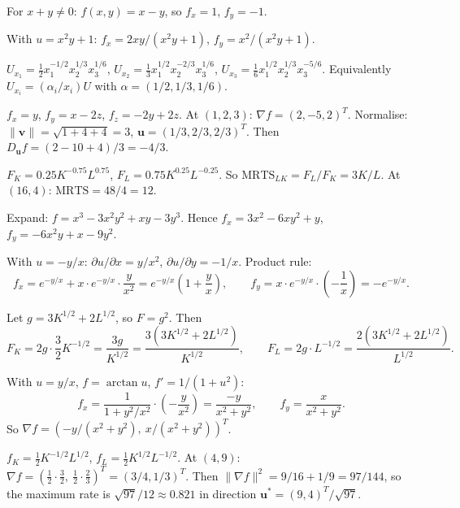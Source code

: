 \begin{solutions}
  \item For $x+y\neq0$: $f(x,y)=x-y$, so $f_x=1$, $f_y=-1$.

  \item With $u=x^2y+1$: $f_x=2xy/(x^2y+1)$, $f_y=x^2/(x^2y+1)$.

  \item $U_{x_1}=\frac12x_1^{-1/2}x_2^{1/3}x_3^{1/6}$,
        $U_{x_2}=\frac13x_1^{1/2}x_2^{-2/3}x_3^{1/6}$,
        $U_{x_3}=\frac16x_1^{1/2}x_2^{1/3}x_3^{-5/6}$. Equivalently
        $U_{x_i}=(\alpha_i/x_i)U$ with $\alpha=(1/2,1/3,1/6)$.

  \item $f_x=y$, $f_y=x-2z$, $f_z=-2y+2z$. At $(1,2,3)$:
        $\nabla f=(2,-5,2)^T$. Normalise: $\|\mathbf{v}\|=\sqrt{1+4+4}=3$,
        $\mathbf{u}=(1/3,2/3,2/3)^T$. Then
        $D_{\mathbf{u}}f=(2-10+4)/3=-4/3$.

  \item $F_K=0.25K^{-0.75}L^{0.75}$, $F_L=0.75K^{0.25}L^{-0.25}$. So
        $\mathrm{MRTS}_{LK}=F_L/F_K=3K/L$. At $(16,4)$:
        $\mathrm{MRTS}=48/4=12$.

  \item Expand: $f=x^3-3x^2y^2+xy-3y^3$. Hence $f_x=3x^2-6xy^2+y$,
        $f_y=-6x^2y+x-9y^2$.

  \item With $u=-y/x$: $\partial u/\partial x=y/x^2$,
        $\partial u/\partial y=-1/x$. Product rule:
        \[
          f_x=e^{-y/x}+x\cdot e^{-y/x}\cdot\frac{y}{x^2}
            =e^{-y/x}\left(1+\frac{y}{x}\right), \qquad
          f_y=x\cdot e^{-y/x}\cdot\left(-\frac1x\right)=-e^{-y/x} .
        \]

  \item Let $g=3K^{1/2}+2L^{1/2}$, so $F=g^2$. Then
        \[
          F_K=2g\cdot\frac32K^{-1/2}=\frac{3g}{K^{1/2}}
            =\frac{3(3K^{1/2}+2L^{1/2})}{K^{1/2}}, \qquad
          F_L=2g\cdot L^{-1/2}=\frac{2(3K^{1/2}+2L^{1/2})}{L^{1/2}} .
        \]

  \item With $u=y/x$, $f=\arctan u$, $f'=1/(1+u^2)$:
        \[
          f_x=\frac{1}{1+y^2/x^2}\cdot\left(-\frac{y}{x^2}\right)
            =\frac{-y}{x^2+y^2}, \qquad
          f_y=\frac{x}{x^2+y^2} .
        \]
        So $\nabla f=(-y/(x^2+y^2),\ x/(x^2+y^2))^T$.

  \item $f_K=\frac12K^{-1/2}L^{1/2}$, $f_L=\frac12K^{1/2}L^{-1/2}$. At
        $(4,9)$: $\nabla f=(\frac12\cdot\frac32,\ \frac12\cdot\frac23)^T
        =(3/4,1/3)^T$. Then $\|\nabla f\|^2=9/16+1/9=97/144$, so the
        maximum rate is $\sqrt{97}/12\approx0.821$ in direction
        $\mathbf{u}^*=(9,4)^T/\sqrt{97}$.


\end{solutions}
